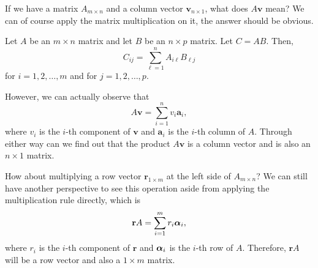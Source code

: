 \documentclass[11pt]{article}
\theoremstyle{break}
\theoremstyle{no_label}
\newcommand{\bfa}{\textbf{a}}
\newcommand{\bfr}{\textbf{r}}
\newcommand{\bfv}{\textbf{v}}
\newcommand{\bfalpha}{\text{\boldmath$\alpha$}}
\numberwithin{equation}{section}
\begin{document}
If we have a matrix $A_{m\times n}$ and a column vector $\bfv_{n\times 1}$, what does $A\bfv$ mean? We can of course apply the matrix multiplication on it, the answer should be obvious.

\begin{definition}
    Let $A$ be an $m\times n$ matrix and let $B$ be an $n\times p$ matrix. Let $C=AB$. Then, $$C_{ij}=\sum_{\ell=1}^{n}A_{i\ell}B_{\ell j}$$ for $i=1,2,\dots,m$ and for $j=1,2,\dots,p$.
\end{definition}

However, we can actually observe that $$A\bfv=\sum_{i=1}^{n} v_i\bfa_i,$$ where $v_i$ is the $i$-th component of $\bfv$ and $\bfa_i$ is the $i$-th column of $A$. Through either way can we find out that the product $A\bfv$ is a column vector and is also an $n\times 1$ matrix.

How about multiplying a row vector $\bfr_{1\times m}$ at the left side of $A_{m\times n}$? We can still have another perspective to see this operation aside from applying the multiplication rule directly, which is $$\bfr A=\sum_{i=1}^{m}r_i\bfalpha_i,$$ where $r_i$ is the $i$-th component of $\bfr$ and $\bfalpha_i$ is the $i$-th row of $A$. Therefore, $\bfr A$ will be a row vector and also a $1\times m$ matrix.
\end{document}
